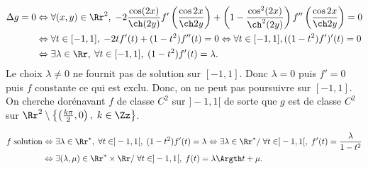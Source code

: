 {{\begin{align*}\ensuremath
\Delta g=0&\Leftrightarrow\forall(x,y)\in\Rr^2,\;-2\frac{\cos(2x)}{\ch(2y)}f'\left(\frac{\cos2x}{\ch2y}\right)+\left(1-\frac{\cos^2(2x)}{\ch^2(2y)}\right)f''\left(\frac{\cos2x}{\ch2y}\right)=0\\
 &\Leftrightarrow\forall t\in[-1,1],\;-2tf'(t)+(1-t^2)f''(t)=0\Leftrightarrow\forall t\in[-1,1],((1-t^2)f')'(t)=0\\
 &\Leftrightarrow\exists \lambda\in\Rr,\;\forall t\in[-1,1],\;(1-t^2)f'(t)=\lambda.
\end{align*}
Le choix $\lambda\neq0$ ne fournit pas de solution sur $[-1,1]$. Donc $\lambda=0$ puis $f'=0$ puis $f$ constante ce qui est exclu. Donc, on ne peut pas poursuivre sur $[-1,1]$.
On cherche dorénavant $f$ de classe $C^2$ sur $]-1,1[$ de sorte que $g$ est de classe $C^2$ sur $\Rr^2\setminus\left\{\left(\frac{k\pi}{2},0\right),\;k\in\Zz\right\}$.

\begin{align*}\ensuremath
f\;\text{solution}&\Leftrightarrow\exists \lambda\in\Rr^*,\;\forall t\in]-1,1[,\;(1-t^2)f'(t)=\lambda\Leftrightarrow\exists \lambda\in\Rr^*/\;\forall t\in]-1,1[,\;f'(t)=\frac{\lambda}{1-t^2}\\
 &\Leftrightarrow\exists(\lambda,\mu)\in\Rr^*\times\Rr/\;\forall t\in]-1,1[,\;f(t)=\lambda\Argth t+\mu.
\end{align*}}
}